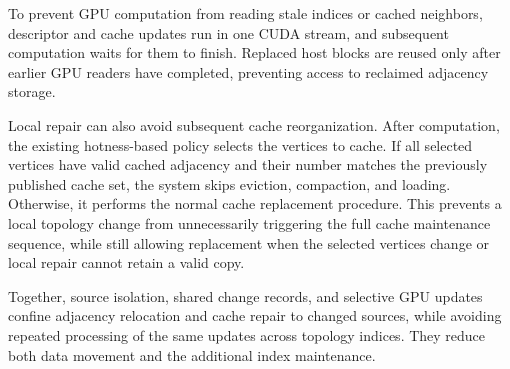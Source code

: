 To prevent GPU computation from reading stale indices or cached neighbors, descriptor and cache updates run in one CUDA stream, and subsequent computation waits for them to finish. Replaced host blocks are reused only after earlier GPU readers have completed, preventing access to reclaimed adjacency storage.

Local repair can also avoid subsequent cache reorganization. After computation, the existing hotness-based policy selects the vertices to cache. If all selected vertices have valid cached adjacency and their number matches the previously published cache set, the system skips eviction, compaction, and loading. Otherwise, it performs the normal cache replacement procedure. This prevents a local topology change from unnecessarily triggering the full cache maintenance sequence, while still allowing replacement when the selected vertices change or local repair cannot retain a valid copy.

Together, source isolation, shared change records, and selective GPU updates confine adjacency relocation and cache repair to changed sources, while avoiding repeated processing of the same updates across topology indices. They reduce both data movement and the additional index maintenance.
